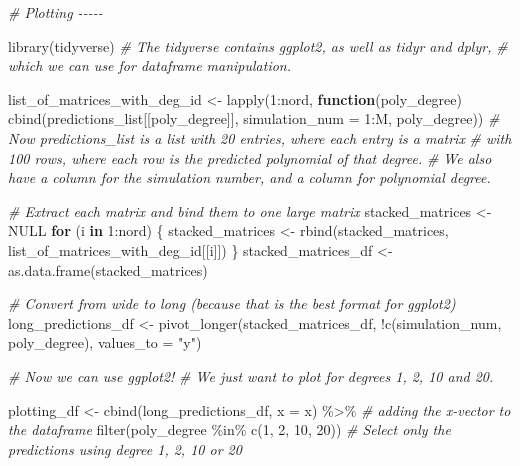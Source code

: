 \documentclass[
]{article}
\newenvironment{Shaded}{\begin{snugshade}}{\end{snugshade}}
\newcommand{\AttributeTok}[1]{\textcolor[rgb]{0.77,0.63,0.00}{#1}}
\newcommand{\CommentTok}[1]{\textcolor[rgb]{0.56,0.35,0.01}{\textit{#1}}}
\newcommand{\ConstantTok}[1]{\textcolor[rgb]{0.00,0.00,0.00}{#1}}
\newcommand{\ControlFlowTok}[1]{\textcolor[rgb]{0.13,0.29,0.53}{\textbf{#1}}}
\newcommand{\DecValTok}[1]{\textcolor[rgb]{0.00,0.00,0.81}{#1}}
\newcommand{\FunctionTok}[1]{\textcolor[rgb]{0.00,0.00,0.00}{#1}}
\newcommand{\NormalTok}[1]{#1}
\newcommand{\OtherTok}[1]{\textcolor[rgb]{0.56,0.35,0.01}{#1}}
\newcommand{\SpecialCharTok}[1]{\textcolor[rgb]{0.00,0.00,0.00}{#1}}
\newcommand{\StringTok}[1]{\textcolor[rgb]{0.31,0.60,0.02}{#1}}
\begin{document}
\begin{Shaded}
\begin{Highlighting}[]
\CommentTok{\# Plotting {-}{-}{-}{-}{-}}

\FunctionTok{library}\NormalTok{(tidyverse) }\CommentTok{\# The tidyverse contains ggplot2, as well as tidyr and dplyr, }
\CommentTok{\# which we can use for dataframe manipulation.}

\NormalTok{list\_of\_matrices\_with\_deg\_id }\OtherTok{\textless{}{-}} \FunctionTok{lapply}\NormalTok{(}\DecValTok{1}\SpecialCharTok{:}\NormalTok{nord, }\ControlFlowTok{function}\NormalTok{(poly\_degree) }\FunctionTok{cbind}\NormalTok{(predictions\_list[[poly\_degree]], }\AttributeTok{simulation\_num =} \DecValTok{1}\SpecialCharTok{:}\NormalTok{M, poly\_degree))}
\CommentTok{\# Now predictions\_list is a list with 20 entries, where each entry is a matrix }
\CommentTok{\# with 100 rows, where each row is the predicted polynomial of that degree.}
\CommentTok{\# We also have a column for the simulation number, and a column for polynomial degree.}

\CommentTok{\# Extract each matrix and bind them to one large matrix}
\NormalTok{stacked\_matrices }\OtherTok{\textless{}{-}}  \ConstantTok{NULL}
\ControlFlowTok{for}\NormalTok{ (i }\ControlFlowTok{in} \DecValTok{1}\SpecialCharTok{:}\NormalTok{nord) \{}
\NormalTok{  stacked\_matrices }\OtherTok{\textless{}{-}}
    \FunctionTok{rbind}\NormalTok{(stacked\_matrices, list\_of\_matrices\_with\_deg\_id[[i]])}
\NormalTok{\}}
\NormalTok{stacked\_matrices\_df }\OtherTok{\textless{}{-}} \FunctionTok{as.data.frame}\NormalTok{(stacked\_matrices)}

\CommentTok{\# Convert from wide to long (because that is the best format for ggplot2)}
\NormalTok{long\_predictions\_df }\OtherTok{\textless{}{-}} \FunctionTok{pivot\_longer}\NormalTok{(stacked\_matrices\_df, }\SpecialCharTok{!}\FunctionTok{c}\NormalTok{(simulation\_num, poly\_degree), }\AttributeTok{values\_to =} \StringTok{"y"}\NormalTok{)}

\CommentTok{\# Now we can use ggplot2!}
\CommentTok{\# We just want to plot for degrees 1, 2, 10 and 20.}

\NormalTok{plotting\_df }\OtherTok{\textless{}{-}} \FunctionTok{cbind}\NormalTok{(long\_predictions\_df, }\AttributeTok{x =}\NormalTok{ x) }\SpecialCharTok{\%\textgreater{}\%} \CommentTok{\# adding the x{-}vector to the dataframe}
  \FunctionTok{filter}\NormalTok{(poly\_degree }\SpecialCharTok{\%in\%} \FunctionTok{c}\NormalTok{(}\DecValTok{1}\NormalTok{, }\DecValTok{2}\NormalTok{, }\DecValTok{10}\NormalTok{, }\DecValTok{20}\NormalTok{)) }\CommentTok{\# Select only the predictions using degree 1, 2, 10 or 20}


\end{Highlighting}
\end{Shaded}
\end{document}

